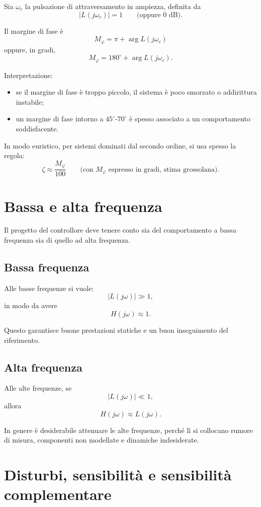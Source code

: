 Sia \(\omega_c\) la pulsazione di attraversamento in ampiezza, definita da
\[
|L(j\omega_c)|=1
\qquad
\text{(oppure 0 dB)}.
\]

Il margine di fase è
\[
M_\varphi = \pi + \arg L(j\omega_c)
\]
oppure, in gradi,
\[
M_\varphi = 180^\circ + \arg L(j\omega_c).
\]

Interpretazione:
\begin{itemize}
    \item se il margine di fase è troppo piccolo, il sistema è poco smorzato
    o addirittura instabile;
    \item un margine di fase intorno a \(45^\circ\)-\(70^\circ\) è spesso
    associato a un comportamento soddisfacente.
\end{itemize}

In modo euristico, per sistemi dominati dal secondo ordine, si usa spesso la regola:
\[
\zeta \approx \frac{M_\varphi}{100}
\qquad
\text{(con \(M_\varphi\) espresso in gradi, stima grossolana).}
\]

\section{Bassa e alta frequenza}

Il progetto del controllore deve tenere conto sia del comportamento a bassa frequenza
sia di quello ad alta frequenza.

\subsection{Bassa frequenza}

Alle basse frequenze si vuole:
\[
|L(j\omega)| \gg 1,
\]
in modo da avere
\[
H(j\omega)\approx 1.
\]

Questo garantisce buone prestazioni statiche e un buon inseguimento del riferimento.

\subsection{Alta frequenza}

Alle alte frequenze, se
\[
|L(j\omega)|\ll 1,
\]
allora
\[
H(j\omega)\approx L(j\omega).
\]

In genere è desiderabile attenuare le alte frequenze, perché lì si collocano
rumore di misura, componenti non modellate e dinamiche indesiderate.

\section{Disturbi, sensibilità e sensibilità complementare}

